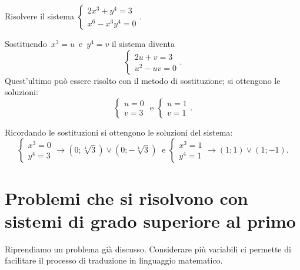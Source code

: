 \begin{exrig}
\begin{esempio}
Risolvere il sistema $\left\{\begin{array}{l}2x^3+y^4=3 \\x^6-x^3y^4=0 \end{array}\right.$.

Sostituendo~$x^{3}=u$~e~$y^{4}=v$ il sistema diventa
\[\left\{\begin{array}{l}2u+v=3 \\u^{2}-uv=0 \end{array}\right..\]
Quest'ultimo può essere risolto con il metodo di sostituzione; si ottengono le soluzioni:
\[\left\{\begin{array}{l}u=0 \\v=3 \end{array}\right.\text{ e }\left\{\begin{array}{l}u=1 \\v=1 \end{array}\right..\]

Ricordando le sostituzioni si ottengono le soluzioni del sistema:
\[\left\{\begin{array}{l}x^{3}=0 \\y^{4}=3\end{array}\right. \rightarrow \left(0;\sqrt[4]{3}\right)\vee\left(0;-\sqrt[4]{3}\right)~\text{ e }\left\{\begin{array}{l}x^{3}=1 \\y^{4}=1\end{array}\right.\rightarrow (1;1)\vee(1;-1).\]
\end{esempio}
\end{exrig}
\ovalbox{\risolvi \ref{ese:6.62}}

\section{Problemi che si risolvono con sistemi di grado superiore al primo}

Riprendiamo un problema già discusso. Considerare più variabili ci permette di facilitare il processo di traduzione in linguaggio matematico.

